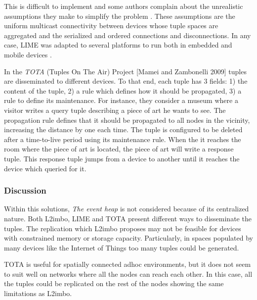 This is difficult to implement and some authors complain about the unrealistic assumptions they make to simplify the problem \citep{coulouris_distributed_2012}. %
These assumptions are the uniform multicast connectivity between devices whose tuple spaces are aggregated and the serialized and ordered connections and disconnections.
In any case, LIME was adapted to several platforms to run both in embedded and mobile devices \citep{murphy_transiently_2006}.


In the \emph{TOTA} (Tuples On The Air) Project [Mamei and Zambonelli 2009] tuples are disseminated to different devices. %
To that end, each tuple has 3 fields:
1) the content of the tuple,
2) a rule which defines how it should be propagated,
3) a rule to define its maintenance.
For instance, they consider a museum where a visitor writes a query tuple describing a piece of art he wants to see.
The propagation rule defines that it should be propagated to all nodes in the vicinity, increasing the distance by one each time.
The tuple is configured to be deleted after a time-to-live period using its maintenance rule.
When the it reaches the room where the piece of art is located, the piece of art will write a response tuple.
This response tuple jumps from a device to another until it reaches the device which queried for it.



\subsubsection{Discussion}


Within this solutions, \emph{The event heap} is not considered because of its centralized nature.
Both L2imbo, LIME and TOTA present different ways to disseminate the tuples.
The replication which L2imbo proposes may not be feasible for devices with constrained memory or storage capacity.
Particularly, in spaces populated by many devices like the Internet of Things too many tuples could be generated.

TOTA is useful for spatially connected adhoc environments, but it does not seem to suit well on networks where all the nodes can reach each other.
In this case, all the tuples could be replicated on the rest of the nodes showing the same limitations as L2imbo.%

